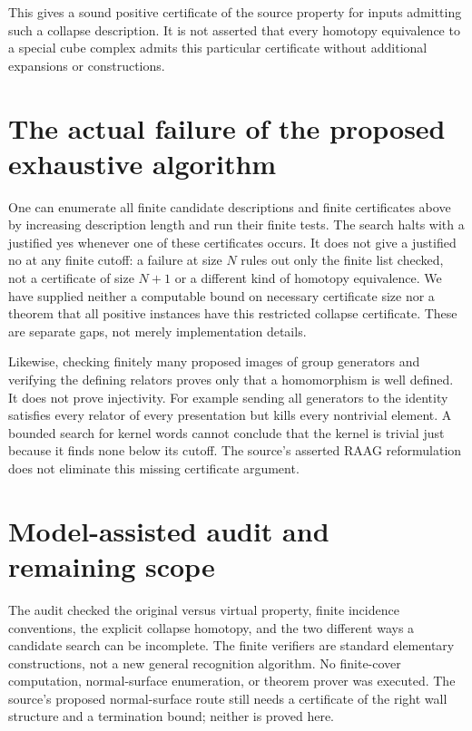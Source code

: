 \documentclass[11pt]{article}
\begin{document}
This gives a sound positive certificate of the source property for
inputs admitting such a collapse description. It is not asserted
that every homotopy equivalence to a special cube complex admits
this particular certificate without additional expansions or constructions.

\section{The actual failure of the proposed exhaustive algorithm}
One can enumerate all finite candidate descriptions and finite
certificates above by increasing description length and run their
finite tests. The search halts with a justified yes whenever one
of these certificates occurs. It does not give a justified no at
any finite cutoff: a failure at size $N$ rules out only the finite
list checked, not a certificate of size $N+1$ or a different kind
of homotopy equivalence. We have supplied neither a computable bound
on necessary certificate size nor a theorem that all positive
instances have this restricted collapse certificate. These are
separate gaps, not merely implementation details.

Likewise, checking finitely many proposed images of group generators
and verifying the defining relators proves only that a homomorphism
is well defined. It does not prove injectivity. For example sending
all generators to the identity satisfies every relator of every
presentation but kills every nontrivial element. A bounded search
for kernel words cannot conclude that the kernel is trivial just
because it finds none below its cutoff. The source's asserted RAAG
reformulation does not eliminate this missing certificate argument.

\section{Model-assisted audit and remaining scope}
The audit checked the original versus virtual property, finite
incidence conventions, the explicit collapse homotopy, and the two
different ways a candidate search can be incomplete. The finite
verifiers are standard elementary constructions, not a new general
recognition algorithm. No finite-cover computation, normal-surface
enumeration, or theorem prover was executed. The source's proposed
normal-surface route still needs a certificate of the right wall
structure and a termination bound; neither is proved here.
\end{document}
